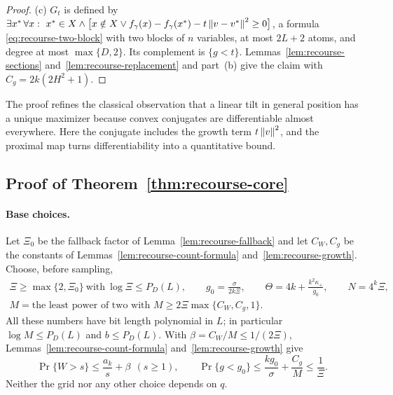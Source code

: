 \begin{proof}
(c) $G_t$ is defined by
$\exists x^*\,\forall x:\ x^*\in X\wedge\bigl[x\notin X\vee
f_\gamma(x)-f_\gamma(x^*)-t\left\lVert v-v^*\right\rVert^2\ge0\bigr]$, a formula
\eqref{eq:recourse-two-block} with two blocks of $n$ variables, at most
$2L+2$ atoms, and degree at most $\max\{D,2\}$. Its complement is
$\{g<t\}$. Lemmas~\ref{lem:recourse-sections}
and~\ref{lem:recourse-replacement} and part~(b) give the claim with
$C_g=2k(2H^2+1)$.
\end{proof}

The proof refines the classical observation that a linear tilt in
general position has a unique maximizer because convex conjugates are
differentiable almost everywhere. Here the conjugate includes the
growth term $t\left\lVert v\right\rVert^2$, and the proximal map turns differentiability
into a quantitative bound.

\subsection{Proof of Theorem~\ref{thm:recourse-core}}
\label{app:recourse-core-proof}

\paragraph{Base choices.}
Let $\Xi_0$ be the fallback factor of Lemma~\ref{lem:recourse-fallback}
and let $C_W,C_g$ be the constants of
Lemmas~\ref{lem:recourse-count-formula} and~\ref{lem:recourse-growth}.
Choose, before sampling,
\begin{equation}
 \begin{gathered}
 \Xi\ge\max\{2,\Xi_0\}\ \text{with}\ \log\Xi\le P_D(L),\qquad
 g_0=\frac\sigma{2k\Xi},\qquad
 \Theta=4k+\frac{k^2\kappa_+}{g_0},\qquad N=4^k\Xi,\\
 M=\text{the least power of two with }M\ge2\Xi\max\{C_W,C_g,1\}.
 \end{gathered}
 \label{eq:recourse-core-params}
\end{equation}
All these numbers have bit length polynomial in $L$; in particular
$\log M\le P_D(L)$ and $b\le P_D(L)$. With $\beta=C_W/M\le1/(2\Xi)$,
Lemmas~\ref{lem:recourse-count-formula} and~\ref{lem:recourse-growth}
give
\begin{equation}
 \Pr\{W>s\}\le\frac{a_k}s+\beta\ \ (s\ge1),\qquad
 \Pr\{g<g_0\}\le\frac{kg_0}\sigma+\frac{C_g}M\le\frac1\Xi .
 \label{eq:recourse-core-tails}
\end{equation}
Neither the grid nor any other choice depends on $q$.

